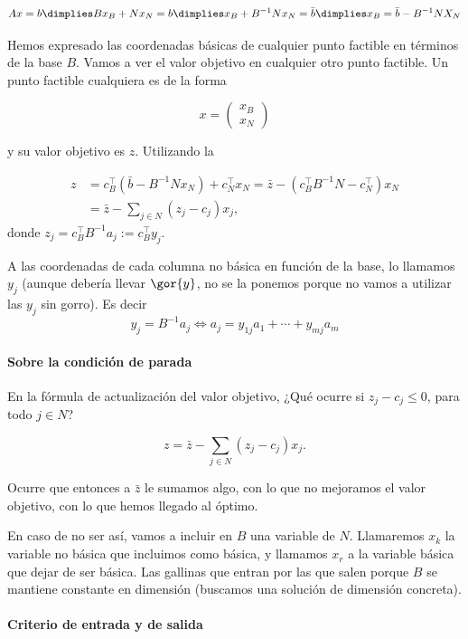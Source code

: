 \begin{equation}
\label{eq:SFB_simplex_expl_1}
Ax = b \dimplies Bx_B + Nx_N = b \dimplies x_B + B^{-1}Nx_N = \bar{b}\dimplies x_B = \bar{b} - B^{-1}NX_N
\end{equation}

Hemos expresado las coordenadas básicas de cualquier punto factible en términos de la base $B$.
Vamos a ver el valor objetivo en cualquier otro punto factible. Un punto factible cualquiera es de la forma 

\[x= \begin{pmatrix}x_B\\\hline x_N\end{pmatrix}\]

y su valor objetivo es $z$. Utilizando la 

\begin{align*}
z &= c_B^\top (\bar{b}-B^{-1} N x_N)+c^\top_N x_N =
 \bar{z}-(c_B^\top B^{-1} N - c_N^\top)x_N\\
  &=\bar{z}- \sum_{j\in N} (z_j-c_j)x_j,
\end{align*}
donde $z_j = c_B^\top B^{-1} a_j:= c_B^\top y_j$.

A las coordenadas de cada columna no básica en función de la base, lo llamamos $y_j$ (aunque debería llevar $\gor{y}$, no se la ponemos porque no vamos a utilizar las $y_j$ sin gorro). Es decir
\[y_j=B^{-1} a_j\Leftrightarrow a_j = y_{1j} a_1+\cdots + y_{mj}a_m\]

\paragraph{Sobre la condición de parada}

En la fórmula de actualización del valor objetivo, ¿Qué ocurre si $z_j-c_j\leq 0$, para todo $j\in N$? 

\[
z = \bar{z}- \sum_{j\in N} (z_j-c_j)x_j.
\]


Ocurre que entonces a $\bar{z}$ le sumamos algo, con lo que no mejoramos el valor objetivo, con lo que hemos llegado al óptimo.


En caso de no ser así, vamos a incluir en $B$ una variable de $N$. Llamaremos $x_k$ la variable no básica que incluimos como básica, y llamamos $x_r$ a la variable básica que dejar de ser básica. Las gallinas que entran por las que salen porque $B$ se mantiene constante en dimensión (buscamos una solución de dimensión concreta).

\paragraph{Criterio de entrada y de salida}

